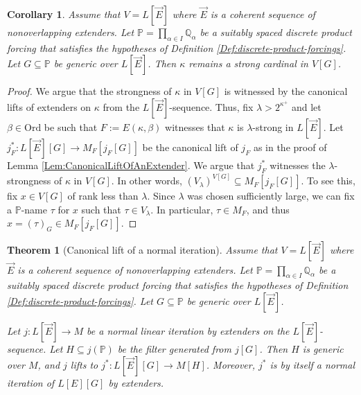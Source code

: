 \documentclass{article}
\theoremstyle{definition}
\theoremstyle{plain}
\newtheorem{theorem}[definition]{Theorem}
\newtheorem{corollary}[definition]{Corollary}
\newcommand{\po}{\mathbb{P}}
\newcommand{\qo}{\mathbb{Q}}
\begin{document}
\begin{corollary}\label{Cor:PreserviungStrongness}
    Assume that $V = L[\vec{E}]$ where $\vec{E}$ is a coherent sequence of nonoverlapping extenders. Let $\po = \prod_{\alpha\in I} \qo_\alpha$ be a suitably spaced discrete product forcing that satisfies the hypotheses of Definition \ref{Def:discrete-product-forcings}. Let $G\subseteq \po$ be generic over $L[\vec{E}]$. Then $\kappa$ remains a strong cardinal in $V[G]$. 
\end{corollary}

\begin{proof}
    We argue that the strongness of $\kappa$ in $V[G]$ is witnessed by the canonical lifts of extenders on $\kappa$ from the $L[\vec{E}]$-sequence. Thus, fix $\lambda>2^{\kappa^+}$ and let $\beta\in \text{Ord}$ be such that $F:=E(\kappa, \beta)$ witnesses that $\kappa$ is $\lambda$-strong in $L[\vec{E}]$.  Let $j^*_F\colon L[\vec E][G]\to M_F[j_F[G]]$ be the canonical lift of $j_F$ as in the proof of Lemma \ref{Lem:CanonicalLiftOfAnExtender}. We argue that $j^*_F$ witnesses the $\lambda$-strongness of $\kappa$ in $V[G]$. In other words, $(V_\lambda)^{V[G]}\subseteq M_F[j_F[G]]$. To see this, fix $x\in V[G]$ of rank less than $\lambda$. Since $\lambda$ was chosen sufficiently large, we can fix a $\po$-name $\tau$ for $x$ such that $\tau\in V_\lambda$. In particular, $\tau\in M_F$, and thus $x = (\tau)_G\in M_F[j_F[G]]$.
\end{proof}

\begin{theorem}[Canonical lift of a normal iteration]\label{Thm:LiftingNormalIteratesAfterDiscreteProcuctForcing}
    Assume that $V = L[\vec{E}]$ where $\vec{E}$ is a coherent sequence of nonoverlapping extenders. Let $\po = \prod_{\alpha\in I} \qo_\alpha$ be a suitably spaced discrete product forcing that satisfies the hypotheses of Definition \ref{Def:discrete-product-forcings}. Let $G\subseteq \po$ be generic over $L[\vec{E}]$.
    
    Let $j\colon L[\vec{E}]\to M$ be a normal linear iteration by extenders on the $L[\vec{E}]$-sequence. Let $H\subseteq j(\po)$ be the filter generated from $j[G]$. Then $H$ is generic over $M$, and $j$ lifts to $j^*\colon L[\vec{E}][G]\to M[H]$. Moreover, $j^*$ is by itself a normal iteration of $L[E][G]$ by extenders.
\end{theorem}
\end{document}
